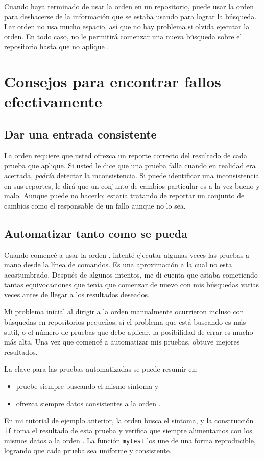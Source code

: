 Cuando haya terminado de usar la orden  en un
repositorio, puede usar la orden  para
deshacerse de la información que se estaba usando para lograr la
búsqueda. Lar orden no usa mucho espacio, así que no hay problema si
olvida ejecutar la orden.  En todo caso,  no le
permitirá comenzar una nueva búsqueda sobre el repositorio hasta que
no aplique .

\section{Consejos para encontrar fallos efectivamente}

\subsection{Dar una entrada consistente}

La orden  requiere que usted ofrezca un reporte correcto
del resultado de cada prueba que aplique.  Si usted le dice que una
prueba falla cuando en realidad era acertada, \emph{podría} detectar
la inconsistencia. Si puede identificar una inconsistencia en sus
reportes, le dirá que un conjunto de cambios particular es a la vez
bueno y malo.  Aunque puede no hacerlo; estaría tratando de reportar
un conjunto de cambios como el responsable de un fallo aunque no lo
sea.

\subsection{Automatizar tanto como se pueda}

Cuando comencé a usar la orden , intenté ejecutar
algunas veces las pruebas a mano desde la línea de comandos. Es una
aproximación a la cual no esta acostumbrado. Después de algunos
intentos, me di cuenta que estaba cometiendo tantas equivocaciones que
tenía que comenzar de nuevo con mis búsquedas varias veces antes de
llegar a los resultados deseados.

Mi problema inicial al dirigir a la orden  manualmente
ocurrieron incluso con búsquedas en repositorios pequeños; si el
problema que está buscando es más sutil, o el número de pruebas que
 debe aplicar, la posibilidad de errar es mucho más
alta. Una vez que comencé a automatizar mis pruebas, obtuve mejores
resultados.

La clave para las pruebas automatizadas se puede resumir en:
\begin{itemize}
\item pruebe siempre buscando el mismo síntoma y
\item ofrezca siempre datos consistentes a la orden .
\end{itemize}
En mi tutorial de ejemplo anterior, la orden  busca el
síntoma, y la construcción \texttt{if} toma el resultado de esta
prueba y verifica que siempre alimentamos con los mismos datos a la
orden . La función \texttt{mytest} los une de una forma
reproducible, logrando que cada prueba sea uniforme y consistente.

